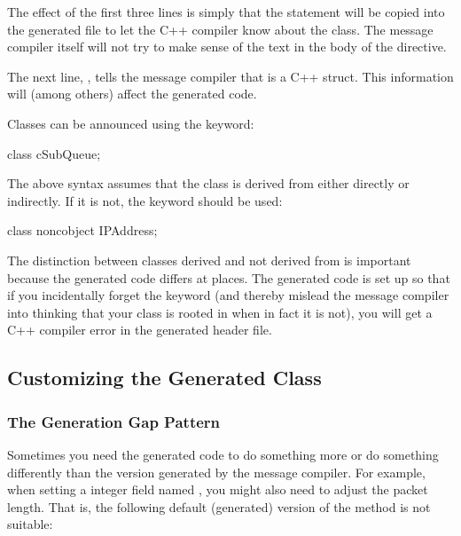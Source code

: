 The effect of the first three lines is simply that the 
statement will be copied into the generated 
file to let the C++ compiler know about the  class.
The message compiler itself will not try to make sense of the
text in the body of the  directive.

The next line, , tells the message compiler that
 is a C++ struct. This information will (among others)
affect the generated code.

Classes can be announced using the  keyword:

\begin{msg}
class cSubQueue;
\end{msg}

The above syntax assumes that the class is derived from 
either directly or indirectly. If it is not, the 
keyword should be used:

\begin{msg}
class noncobject IPAddress;
\end{msg}

The distinction between classes derived and not derived from 
is important because the generated code differs at places.
The generated code is set up so that if you incidentally
forget the  keyword (and thereby mislead the
message compiler into thinking that your class is rooted in
 when in fact it is not), you will get a C++ compiler
error in the generated header file.


\subsection{Customizing the Generated Class}
\label{sec:ch-messages:customizing-generated-class}


\subsubsection{The Generation Gap Pattern}

Sometimes you need the generated code to do something
more or do something differently than the version generated
by the message compiler.
For example, when setting a integer field named ,
you might also need to adjust the packet length. That is,
the following default (generated) version of the
 method is not suitable:

